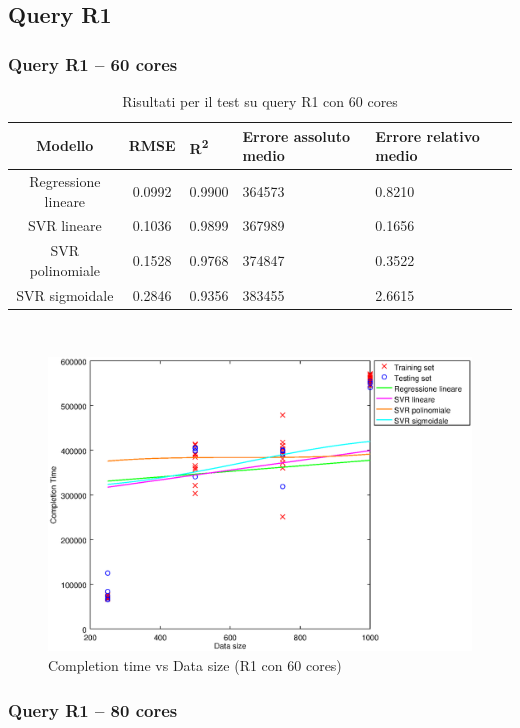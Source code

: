 \documentclass[a4paper,11pt]{article}
\begin{document}
\subsection{Query R1}
\subsubsection{Query R1 -- 60 cores}
\begin{table}[bhpt]
	\centering
	\begin{adjustbox}{center}
		\begin{tabular}{c | c M{1cm} M{2.5cm} M{2.5cm} M{1.8cm}}
			Modello & RMSE & R\textsuperscript{2} & Errore assoluto medio & Errore relativo medio \tabularnewline
			\hline
			Regressione lineare & 0.0992 & 0.9900 & 364573 & 0.8210 \\
			SVR lineare & 0.1036 & 0.9899 & 367989 & 0.1656 \\
			SVR polinomiale & 0.1528 & 0.9768 & 374847 & 0.3522 \\
			SVR sigmoidale & 0.2846 & 0.9356 & 383455 & 2.6615 \\
		\end{tabular}
	\end{adjustbox}
	\\
	\caption{Risultati per il test su query R1 con 60 cores}
	\label{table_R1_60cores}
\end{table}

\begin {figure}[hbtp]
\centering
\includegraphics[width=\textwidth]{output/R1_60CORES/plot_R1_60CORES.eps}
\caption {Completion time vs Data size (R1 con 60 cores)}
\end {figure}
\newpage
\subsubsection{Query R1 -- 80 cores}
\newpage
\end{document}

